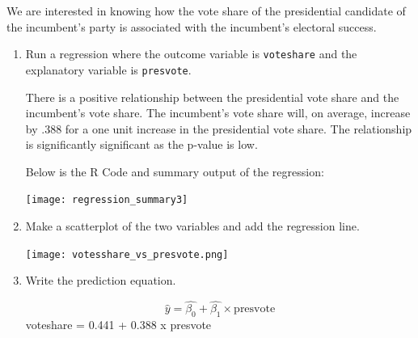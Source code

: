 \documentclass[12pt,letterpaper]{article}
\begin{document}
\noindent We are interested in knowing how the vote share of the presidential candidate of the incumbent's party is associated with the incumbent's electoral success.
	\vspace{.25cm}
	\begin{enumerate}
		\item Run a regression where the outcome variable is \texttt{voteshare} and the explanatory variable is \texttt{presvote}.
			\vspace{.25cm}
			
			There is a positive relationship between the presidential vote share and the incumbent's vote share. The incumbent's vote share will, on average, increase by .388 for a one unit increase in the presidential vote share. The relationship is significantly significant as the p-value is low. 
			
			Below is the R Code and summary output of the regression: 
			
			\texttt{[image: regression\_summary3]}
			
		\item Make a scatterplot of the two variables and add the regression line. 
			\vspace{.25cm}
			
			\texttt{[image: votesshare\_vs\_presvote.png]}
			
			
		\item Write the prediction equation.
		
		$$\hat{y}= \hat{\beta_0} + \hat{\beta_1} \times \text{presvote}$$
		voteshare = 0.441 + 0.388 x presvote
	\end{enumerate}
	

\newpage	
\end{document}
